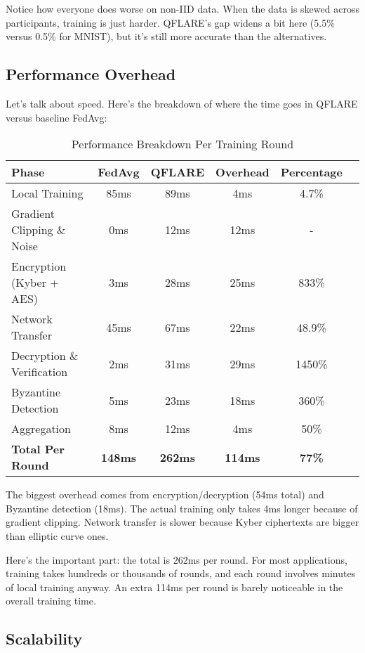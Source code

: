 \documentclass[journal]{IEEEtran}
\begin{document}
Notice how everyone does worse on non-IID data. When the data is skewed across participants, training is just harder. QFLARE's gap widens a bit here (5.5\% versus 0.5\% for MNIST), but it's still more accurate than the alternatives.

\subsection{Performance Overhead}

Let's talk about speed. Here's the breakdown of where the time goes in QFLARE versus baseline FedAvg:

\begin{table}[htbp]
\centering
\caption{Performance Breakdown Per Training Round}
\label{tab:performance_breakdown}
\begin{tabular}{@{}lccccc@{}}
\toprule
\textbf{Phase} & \textbf{FedAvg} & \textbf{QFLARE} & \textbf{Overhead} & \textbf{Percentage} \\
\midrule
Local Training & 85ms & 89ms & 4ms & 4.7\% \\
Gradient Clipping \& Noise & 0ms & 12ms & 12ms & - \\
Encryption (Kyber + AES) & 3ms & 28ms & 25ms & 833\% \\
Network Transfer & 45ms & 67ms & 22ms & 48.9\% \\
Decryption \& Verification & 2ms & 31ms & 29ms & 1450\% \\
Byzantine Detection & 5ms & 23ms & 18ms & 360\% \\
Aggregation & 8ms & 12ms & 4ms & 50\% \\
\midrule
\textbf{Total Per Round} & \textbf{148ms} & \textbf{262ms} & \textbf{114ms} & \textbf{77\%} \\
\bottomrule
\end{tabular}
\end{table}

The biggest overhead comes from encryption/decryption (54ms total) and Byzantine detection (18ms). The actual training only takes 4ms longer because of gradient clipping. Network transfer is slower because Kyber ciphertexts are bigger than elliptic curve ones.

Here's the important part: the total is 262ms per round. For most applications, training takes hundreds or thousands of rounds, and each round involves minutes of local training anyway. An extra 114ms per round is barely noticeable in the overall training time.

\subsection{Scalability}
\end{document}
